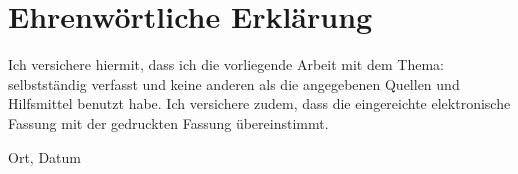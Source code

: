 
\clearpage
\chapter*{Ehrenwörtliche Erklärung}


Ich versichere hiermit, dass ich die vorliegende Arbeit
 mit dem Thema: \textit{\TheThesisTitle} selbstständig verfasst und keine anderen als die angegebenen Quellen und
Hilfsmittel benutzt habe. Ich versichere zudem,
dass die eingereichte elektronische Fassung mit der gedruckten Fassung übereinstimmt.

\vspace{3cm}
Ort, Datum \hfill \TheThesisAuthor
